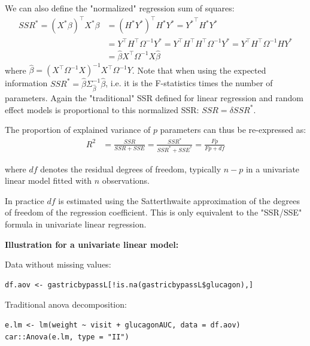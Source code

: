 \documentclass[12pt]{article}
\newcommand\Warning[1][3ex]{%
\renewcommand\stacktype{L}%
\scaleto{\stackon[1.3pt]{\color{red}$\triangle$}{\tiny\bfseries !}}{#1}%
\xspace
}
\newcommand\trans[1]{{#1}^\intercal}%
\begin{document}
\bigskip

We can also define the "normalized" regression sum of squares:
\begin{align*}
SSR^* = \trans{(X^*\beta)}X^*\beta &= \trans{\left(H^* Y^*\right)} H^* Y^* = \trans{Y^*} H^* Y^* \\
&= \trans{Y} \trans{H} \Omega^{-1} Y^* = \trans{Y} \trans{H} \trans{H} \Omega^{-1} Y^* = \trans{Y} \trans{H} \Omega^{-1} H Y^* \\
&= \widehat{\beta} \trans{X} \Omega^{-1} X \widehat{\beta}
\end{align*}
where \(\widehat{\beta}= \left(\trans{X}\Omega^{-1}
X\right)^{-1}\trans{X} \Omega^{-1} Y\). Note that when using the
expected information \(SSR^* = \widehat{\beta}
\Sigma^{-1}_{\widehat{\beta}} \widehat{\beta}\), i.e. it is the
F-statistics times the number of parameters. Again the "traditional"
SSR defined for linear regression and random effect models is
proportional to this normalized SSR: \(SSR=\delta SSR^{*}\).

\bigskip

The proportion of explained variance of \(p\) parameters can thus be
re-expressed as:
\begin{align*}
R^2 &= \frac{SSR}{SSR+SSE} = \frac{SSR^*}{SSR^*+SSE^*}= \frac{Fp}{Fp+df}
\end{align*}

where \(df\) denotes the residual degrees of freedom, typically
\(n-p\) in a univariate linear model fitted with \(n\)
observations. \newline \Warning In practice \(df\) is estimated using the
Satterthwaite approximation of the degrees of freedom of the
regression coefficient. This is only equivalent to the "SSR/SSE"
formula in univariate linear regression.

\bigskip
\bigskip

\textbf{Illustration for a univariate linear model:}

\bigskip

Data without missing values:
\lstset{language=r,label= ,caption= ,captionpos=b,numbers=none}
\begin{lstlisting}
df.aov <- gastricbypassL[!is.na(gastricbypassL$glucagon),]
\end{lstlisting}

Traditional anova decomposition:
\lstset{language=r,label= ,caption= ,captionpos=b,numbers=none}
\begin{lstlisting}
e.lm <- lm(weight ~ visit + glucagonAUC, data = df.aov)
car::Anova(e.lm, type = "II")
\end{lstlisting}
\end{document}
